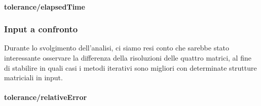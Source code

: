 \paragraph{tolerance/elapsedTime}




\subsubsection{Input a confronto}
Durante lo svolgimento dell'analisi, ci siamo resi conto che sarebbe stato interessante osservare la differenza della risoluzioni delle quattro matrici, al fine di stabilire in quali casi i metodi iterativi sono migliori con determinate strutture matriciali in input.

\paragraph{tolerance/relativeError}



